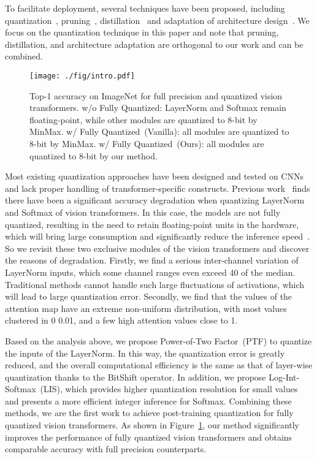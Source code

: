 \documentclass{article}
\begin{document}
To facilitate deployment, several techniques have been proposed, including quantization~\cite{zhou2016dorefa,nagel2020up,shen2020q,liu2021post}, pruning~\cite{han2015deep}, distillation~\cite{jiao2019tinybert} and adaptation of architecture design~\cite{graham2021levit}. We focus on the quantization technique in this paper and note that pruning, distillation, and architecture adaptation are orthogonal to our work and can be combined.

\begin{figure}[t]

\centering
\texttt{[image: ./fig/intro.pdf]}
\vskip -0.1in
\caption{Top-1 accuracy on ImageNet for full precision and quantized vision transformers.
w/o Fully Quantized: LayerNorm and Softmax remain floating-point, while other modules are quantized to 8-bit by MinMax.
w/ Fully Quantized~(Vanilla): all modules are quantized to 8-bit by MinMax.
w/ Fully Quantized~(Ours): all modules are quantized to 8-bit by our method. 
}
\label{fig:intro}
\vskip -0.1in
\end{figure}


Most existing quantization approaches have been designed and tested on CNNs and lack proper handling of transformer-specific constructs. Previous work~\cite{liu2021post} finds there have been a significant accuracy degradation when quantizing LayerNorm and Softmax of vision transformers. In this case, the models are not fully quantized, resulting in the need to retain floating-point units in the hardware, which will bring large consumption and significantly reduce the inference speed~\cite{8716697}.
So we revisit these two exclusive modules of the vision transformers and discover the reasons of degradation. Firstly, we find a serious inter-channel variation of LayerNorm inputs, which some channel ranges even exceed 40 of the median. Traditional methods cannot handle such large fluctuations of activations, which will lead to large quantization error.
Secondly, we find that the values of the attention map have an extreme non-uniform distribution, with most values clustered in 0  0.01, and a few high attention values close to 1.

Based on the analysis above, we propose Power-of-Two Factor~(PTF) to quantize the inputs of the LayerNorm. In this way, the quantization error is greatly reduced, and the overall computational efficiency is the same as that of layer-wise quantization thanks to the BitShift operator.
In addition, we propose Log-Int-Softmax~(LIS), which provides higher quantization resolution for small values and presents a more efficient integer inference for Softmax.
Combining these methods, we are the first work to achieve post-training quantization for fully quantized vision transformers. As shown in Figure~\ref{fig:intro}, our method significantly improves the performance of fully quantized vision transformers and obtains comparable accuracy with full precision counterparts.
\end{document}

